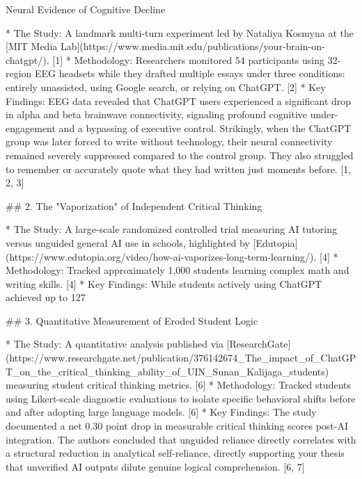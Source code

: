 Neural Evidence of Cognitive Decline

* The Study: A landmark multi-turn experiment led by Nataliya Kosmyna at the [MIT Media Lab](https://www.media.mit.edu/publications/your-brain-on-chatgpt/). [1] 
* Methodology: Researchers monitored 54 participants using 32-region EEG headsets while they drafted multiple essays under three conditions: entirely unassisted, using Google search, or relying on ChatGPT. [2] 
* Key Findings: EEG data revealed that ChatGPT users experienced a significant drop in alpha and beta brainwave connectivity, signaling profound cognitive under-engagement and a bypassing of executive control. Strikingly, when the ChatGPT group was later forced to write without technology, their neural connectivity remained severely suppressed compared to the control group. They also struggled to remember or accurately quote what they had written just moments before. [1, 2, 3] 

## 2. The "Vaporization" of Independent Critical Thinking

* The Study: A large-scale randomized controlled trial measuring AI tutoring versus unguided general AI use in schools, highlighted by [Edutopia](https://www.edutopia.org/video/how-ai-vaporizes-long-term-learning/). [4] 
* Methodology: Tracked approximately 1,000 students learning complex math and writing skills. [4] 
* Key Findings: While students actively using ChatGPT achieved up to 127%

## 3. Quantitative Measurement of Eroded Student Logic

* The Study: A quantitative analysis published via [ResearchGate](https://www.researchgate.net/publication/376142674_The_impact_of_ChatGPT_on_the_critical_thinking_ability_of_UIN_Sunan_Kalijaga_students) measuring student critical thinking metrics. [6] 
* Methodology: Tracked students using Likert-scale diagnostic evaluations to isolate specific behavioral shifts before and after adopting large language models. [6] 
* Key Findings: The study documented a net 0.30 point drop in measurable critical thinking scores post-AI integration. The authors concluded that unguided reliance directly correlates with a structural reduction in analytical self-reliance, directly supporting your thesis that unverified AI outputs dilute genuine logical comprehension. [6, 7] 

